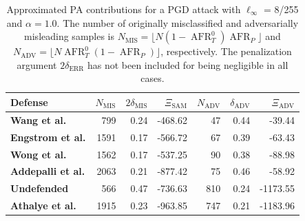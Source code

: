 \begin{table}[H]
    \centering
    \begin{tabular}{l|rrr|rrr}
    Defense & $N_{\text{MIS}}$ & $2 \delta_{\text{MIS}}$ & $\Xi_{\text{SAM}}$ & $N_{\text{ADV}}$ & $\delta_{\text{ADV}}$ & $\Xi_{\text{ADV}}$ \\
    \midrule
    {\color{tab:brown} \textbf{Wang et al.}} & 799 & 0.24 & -468.62 & 47 & 0.44 & -39.44 \\
    {\color{tab:blue} \textbf{Engstrom et al.}} & 1591 & 0.17 & -566.72 & 67 & 0.39 & -63.43 \\
    {\color{tab:red} \textbf{Wong et al.}} & 1562 & 0.17 & -537.25 & 90 & 0.38 & -88.98 \\
    {\color{tab:purple} \textbf{Addepalli et al.}} & 2063 & 0.21 & -877.42 & 75 & 0.46 & -58.92 \\
    {\color{tab:orange} \textbf{Undefended}} & 566 & 0.47 & -736.63 & 810 & 0.24 & -1173.55 \\
    {\color{tab:green} \textbf{Athalye et al.}} & 1915 & 0.23 & -963.85 & 747 & 0.21 & -1183.96 \\
    \bottomrule
    \end{tabular}
    \caption{
    Approximated PA contributions for a PGD attack with $\ell_\infty$ = 8/255 and
    $\alpha = 1.0$. The number of originally misclassified and adversarially misleading
    samples is $N_{\text{MIS}} = \lfloor N (1-\operatorname{AFR}_T^0) \operatorname{AFR}_P \rfloor$ and
    $N_{\text{ADV}} = \lfloor N \operatorname{AFR}_T^0 (1-\operatorname{AFR}_P) \rfloor$, respectively. 
    The penalization argument $2 \delta_{\text{ERR}}$ has not
    been included for being negligible in all cases.
    }
    \label{tab:approx_pa_pgd_table}
\end{table}


